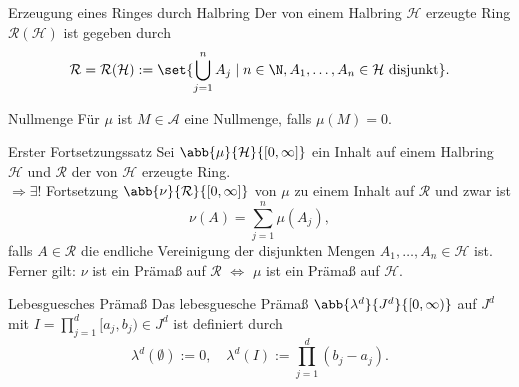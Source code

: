 \begin{karte}{Erzeugung eines Ringes durch Halbring}
	Der von einem Halbring \( \mathcal{H} \) erzeugte Ring \( \mathcal{R}(\mathcal{H}) \) ist gegeben durch 
	\[ \mathcal{R} = \mathcal{R}(\mathcal{H}) := \set{ \bigcup_{j=1}^n A_j \;|\; n\in\N, A_1, \ldots, A_n \in \mathcal{H} \text{ disjunkt} }. \]
\end{karte}

\begin{karte}{Nullmenge}
	Für \(\mu\) ist \( M\in \mathcal{A} \) eine Nullmenge, falls \( \mu(M) = 0 \).
\end{karte}

\begin{karte}{Erster Fortsetzungssatz}
	Sei \( \abb{\mu}{\mathcal{H}}{[0,\infty]} \) ein Inhalt auf einem Halbring \(\mathcal{H}\) 
	und \( \mathcal{R} \) der von \(\mathcal{H}\) erzeugte Ring.\\
	\(\Rightarrow \exists !\) Fortsetzung \( \abb{\nu}{\mathcal{R}}{[0,\infty]} \) von \(\mu\) 
	zu einem Inhalt auf \(\mathcal{R}\) und zwar ist 
	\[ \nu(A) = \sum_{j=1}^n \mu(A_j), \]
	falls \(A \in \mathcal{R}\) die endliche Vereinigung der disjunkten Mengen \(A_1,\ldots,A_n\in\mathcal{H}\) ist.\\
	Ferner gilt: \(\nu\) ist ein Prämaß auf \(\mathcal{R}\) 
	\(\Leftrightarrow\) \(\mu\) ist ein Prämaß auf \(\mathcal{H}\).
\end{karte}

\begin{karte}{Lebesguesches Prämaß}
	Das lebesguesche Prämaß \( \abb{\lambda^d}{J^d}{[0,\infty)} \) auf \(J^d\) 
	mit \(I = \prod_{j=1}^d [a_j,b_j) \in J^d \) ist definiert durch 
	\[ \lambda^d(\emptyset) := 0, \quad \lambda^d(I) := \prod_{j=1}^d (b_j - a_j). \] 
\end{karte}